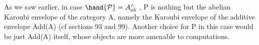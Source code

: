 As we saw earlier, in case $\hand{\mathcal{P}} = A^{\wedge}_{ab}$ , P is nothing but the abelian
Karoubi envelope of the category A, namely the Karoubi envelope of
the additive envelope Add(A) (cf sections 93 and 99). Another choice
for P in this case would be just Add(A) itself, whose objects are more
amenable to computations.

